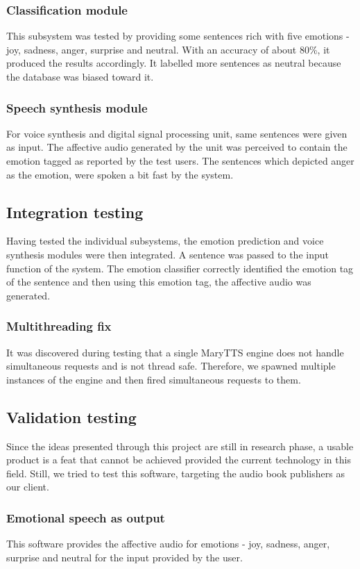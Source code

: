 \documentclass[oneside,a4paper,12pt]{book}
\begin{document}
\subsubsection{Classification module}
This subsystem was tested by providing some sentences rich with five emotions - joy, sadness, anger,  surprise and neutral. With an accuracy of about 80\%, it produced the results accordingly. It labelled more sentences as neutral because the database was biased toward it.

\subsubsection{Speech synthesis module} 
For voice synthesis and digital signal processing unit, same sentences were given as input. The affective audio generated by the unit was perceived to contain the emotion tagged as reported by the test users. The sentences which depicted anger as the emotion, were spoken a bit fast by the system.

\subsection{Integration testing}
Having tested the individual subsystems, the emotion prediction and voice synthesis modules were then integrated. A sentence was passed to the input function of the system. The emotion classifier correctly identified the emotion tag of the sentence and then using this emotion tag, the affective audio was generated.
\subsubsection{Multithreading fix}
It was discovered during testing that a single MaryTTS engine does not handle simultaneous requests and is not thread safe. Therefore, we spawned multiple instances of the engine and then fired simultaneous requests to them.

\subsection{Validation testing}
Since the ideas presented through this project are still in research phase, a usable product is a feat that cannot be achieved provided the current technology in this field. Still, we tried to test this software, targeting the audio book publishers as our client.
\subsubsection{Emotional speech as output}
This software provides the affective audio for emotions - joy, sadness, anger, surprise and neutral for the input provided by the user.
\end{document}
